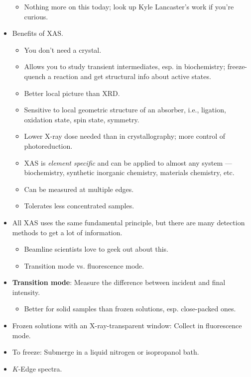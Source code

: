 \documentclass[../notes.tex]{subfiles}
\begin{document}
\begin{itemize}
\begin{itemize}
        \item Nothing more on this today; look up Kyle Lancaster's work if you're curious.
    \end{itemize}
    \item Benefits of XAS.
    \begin{itemize}
        \item You don't need a crystal.
        \item Allows you to study transient intermediates, esp. in biochemistry; freeze-quench a reaction and get structural info about active states.
        \item Better local picture than XRD.
        \item Sensitive to local geometric structure of an absorber, i.e., ligation, oxidation state, spin state, symmetry.
        \item Lower X-ray dose needed than in crystallography; more control of photoreduction.
        \item XAS is \emph{element specific} and can be applied to almost any system --- biochemistry, synthetic inorganic chemistry, materials chemistry, etc.
        \item Can be measured at multiple edges.
        \item Tolerates less concentrated samples.
    \end{itemize}
    \item All XAS uses the same fundamental principle, but there are many detection methods to get a lot of information.
    \begin{itemize}
        \item Beamline scientists love to geek out about this.
        \item Transition mode vs. fluorescence mode.
    \end{itemize}
    \item \textbf{Transition mode}: Measure the difference between incident and final intensity.
    \begin{itemize}
        \item Better for solid samples than frozen solutions, esp. close-packed ones.
    \end{itemize}
    \item Frozen solutions with an X-ray-transparent window: Collect in fluorescence mode.
    \item To freeze: Submerge in a liquid nitrogen or isopropanol bath.
    \item $K$-Edge spectra.
    \begin{itemize}

\end{itemize}
\end{itemize}
\end{document}
